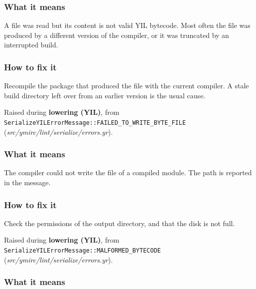 \subsubsection*{What it means}

A  file was read but its content is not valid YIL bytecode. Most often the file was produced by a different version of the compiler, or it was truncated by an interrupted build.

\subsubsection*{How to fix it}

Recompile the package that produced the file with the current compiler. A stale build directory left over from an earlier version is the usual cause.

\label{sec:codes:e5004}

Raised during \textbf{lowering (YIL)}, from \texttt{SerializeYILErrorMessage::\allowbreak{}FAILED\_\allowbreak{}TO\_\allowbreak{}WRITE\_\allowbreak{}BYTE\_\allowbreak{}FILE} (\textit{src/\allowbreak{}ymirc/\allowbreak{}lint/\allowbreak{}serialize/\allowbreak{}errors.yr}).

\subsubsection*{What it means}

The compiler could not write the  file of a compiled module. The path is reported in the message.

\subsubsection*{How to fix it}

Check the permissions of the output directory, and that the disk is not full.

\label{sec:codes:e5005}

Raised during \textbf{lowering (YIL)}, from \texttt{SerializeYILErrorMessage::\allowbreak{}MALFORMED\_\allowbreak{}BYTECODE} (\textit{src/\allowbreak{}ymirc/\allowbreak{}lint/\allowbreak{}serialize/\allowbreak{}errors.yr}).

\subsubsection*{What it means}

